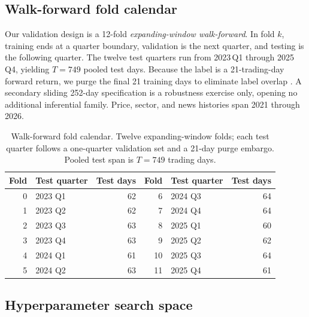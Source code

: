 \documentclass{article}
\begin{document}
\subsection{Walk-forward fold calendar}\label{app:setup:folds}

Our validation design is a 12-fold \emph{expanding-window walk-forward}. In fold $k$, training ends at a quarter boundary, validation is the next quarter, and testing is the following quarter. The twelve test quarters run from 2023\,Q1 through 2025\,Q4, yielding $T=749$ pooled test days. Because the label is a 21-trading-day forward return, we purge the final 21 training days to eliminate label overlap \citep{lopezdeprado2018advances}. A secondary sliding 252-day specification is a robustness exercise only, opening no additional inferential family.
Price, sector, and news histories span 2021 through 2026.

\begin{table}[h]
  \centering
  \caption{Walk-forward fold calendar. Twelve expanding-window folds; each test quarter follows a one-quarter validation set and a 21-day purge embargo. Pooled test span is $T=749$ trading days.}
  \label{app:setup:tab:folds}
  \begin{tabular}{rlr@{\hspace{2em}}rlr}
    \toprule
    Fold & Test quarter & Test days & Fold & Test quarter & Test days \\
    \midrule
    0 & 2023 Q1 & 62 & 6  & 2024 Q3 & 64 \\
    1 & 2023 Q2 & 62 & 7  & 2024 Q4 & 64 \\
    2 & 2023 Q3 & 63 & 8  & 2025 Q1 & 60 \\
    3 & 2023 Q4 & 63 & 9  & 2025 Q2 & 62 \\
    4 & 2024 Q1 & 61 & 10 & 2025 Q3 & 64 \\
    5 & 2024 Q2 & 63 & 11 & 2025 Q4 & 61 \\
    \bottomrule
  \end{tabular}
\end{table}

\subsection{Hyperparameter search space}\label{app:setup:grid}
\end{document}
